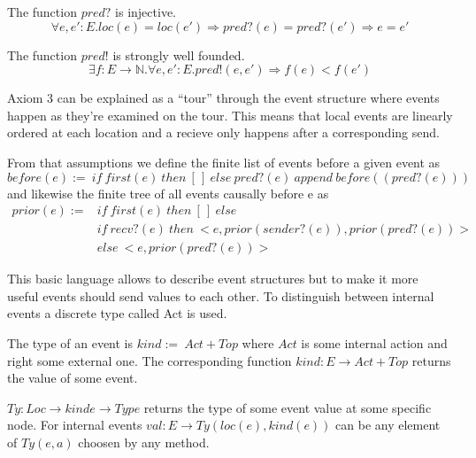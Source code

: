 \begin{axiom}
  The function $pred?$ is injective.
  \[\forall e,e':E.loc(e) = loc(e')\Rightarrow pred?(e) = pred?(e')\Rightarrow e=e'\]
\end{axiom}

\begin{axiom}
  The function $pred!$ is strongly well founded.
  \[\exists f:E\rightarrow \mathbb{N}.\forall e,e':E.pred!(e,e')\Rightarrow f(e)<f(e')\]
\end{axiom}

Axiom 3 can be explained as a ``tour'' through the event structure where
events happen as they're examined on the tour. This means that local
events are linearly ordered at each location and a recieve only happens
after a corresponding send.~\cite{bickford2005causal}

From that assumptions we define the finite list of events before a given event as
\[before(e):=\ if\ first(e)\ then\ [\,]\ else\ pred?(e)\ append\ before((pred?(e)))\] 
and likewise the finite tree of all events causally before e as
\begin{align*}
  prior(e):= & if\ first(e)\ then\ [\,]\ else\\
             & if\ recv?(e)\ then\ <e,prior(sender?(e)),prior(pred?(e))>\\
             & else\ <e,prior(pred?(e))>
\end{align*}

This basic language allows to describe event structures but to make
it more useful events should send values to each other. To distinguish
between internal events a discrete type called Act is used.~\cite{bickford2005causal}

\begin{defi}
  The type of an event is $kind :=\ Act + Top$ where $Act$ is some
  internal action and right some external one. The corresponding function
  $kind: E\rightarrow Act + Top$ returns the value of some event.
\end{defi}

\begin{defi}
  $Ty:Loc\rightarrow kinde\rightarrow Type$ returns the type of some event value at some specific
  node. For internal events $val:E\rightarrow Ty(loc(e),kind(e))$ can be any element of
  $Ty(e,a)$ choosen by any method.
\end{defi}

